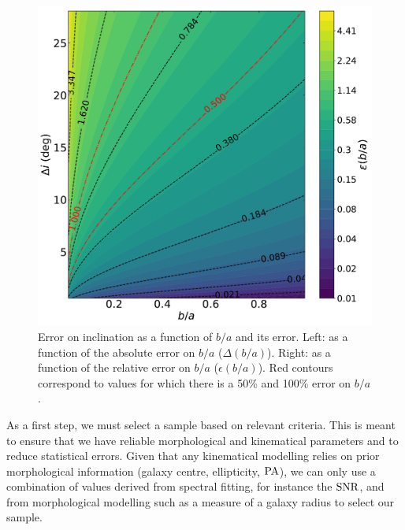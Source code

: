 \begin{figure}[H]
\begin{minipage}[c]{0.49\linewidth}
		\includegraphics[width=\linewidth]{../Plots/RelError_on_inc_versus_b_a.pdf}
	\end{minipage}
	\caption[Error on inclination as a function of $b/a$ and its error.]{Error on inclination as a function of $b/a$ and its error. Left: as a function of the absolute error on $b/a$ ($\Delta (b/a)$). Right: as a function of the relative error on $b/a$ ($\epsilon ( b/a)$). Red contours correspond to values for which there is a 50\% and 100\% error on $b/a$.}
	\label{fig:erreur_inclinaison}
\end{figure}

As a first step, we must select a sample based on relevant criteria. This is meant to ensure that we have reliable morphological and kinematical parameters and to reduce statistical errors. Given that any kinematical modelling relies on prior morphological information (galaxy centre, ellipticity, $\rm{PA}$), we can only use a combination of values derived from spectral fitting, for instance the $\rm{SNR}$, and from morphological modelling such as a measure of a galaxy radius to select our sample.  

